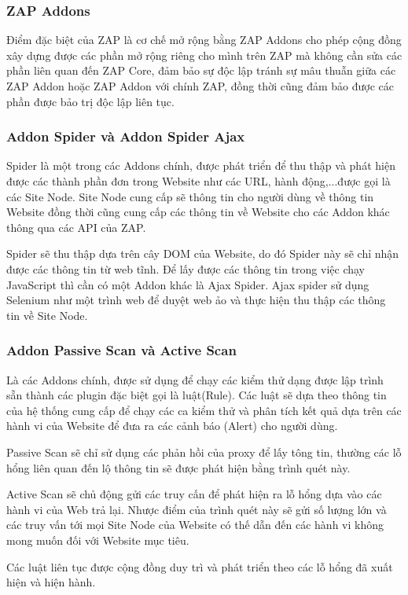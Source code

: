\documentclass[./../main.tex]{subfiles}
\begin{document}
\subsubsection{ZAP Addons}
Điểm đặc biệt của ZAP là cơ chế mở rộng bằng ZAP Addons cho phép cộng đồng
xây dựng được các phần mở rộng riêng cho mình trên ZAP mà không cần sửa
các phần liên quan đến ZAP Core, đảm bảo sự độc lập tránh sự mâu thuẫn giữa
các ZAP Addon hoặc ZAP Addon với chính ZAP, đồng thời cũng đảm bảo được các
phần được bảo trị độc lập liên tục.

\subsubsection{Addon Spider và Addon Spider Ajax}
Spider là một trong các Addons chính, được phát triển để thu thập và phát
hiện được các thành phần đơn trong Website như các URL, hành động,...được gọi là các
Site Node. Site Node cung cấp sẽ thông tin cho người dùng về thông tin
Website đồng thời cũng cung cấp các thông tin về Website cho các Addon
khác thông qua các API của ZAP.

Spider sẽ thu thập dựa trên cây DOM của Website, do đó Spider này sẽ chỉ nhận
được các thông tin từ web tĩnh. Để lấy được các thông tin trong việc chạy
JavaScript thì cần có một Addon khác là Ajax Spider. Ajax spider sử dụng
Selenium như một trình web để duyệt web ảo và thực hiện thu thập các thông
tin về Site Node.
\subsubsection{Addon Passive Scan và Active Scan}
Là các Addons chính, được sử dụng để chạy các kiểm thử dạng được lập trình
sẵn thành các plugin đặc biệt gọi là luật(Rule). Các luật sẽ dựa theo thông
tin của hệ thống cung cấp để chạy các ca kiểm thử và phân tích kết quả dựa
trên các hành vi của Website để đưa ra các cảnh báo (Alert) cho người dùng.

Passive Scan sẽ chỉ sử dụng các phản hồi của proxy để lấy tông tin, thường
các lỗ hổng liên quan đến lộ thông tin sẽ được phát hiện bằng trình quét này.

Active Scan sẽ chủ động gửi các truy cấn để phát hiện ra lỗ hổng dựa vào
các hành vi của Web trả lại. Nhược điểm của trình quét này sẽ gửi số lượng
lớn và các truy vấn tới mọi Site Node của Website có thế dẫn đến các hành vi
không mong muốn đối với Website mục tiêu.

Các luật liên tục được cộng đồng duy trì và phát triển theo các lỗ hổng
đã xuất hiện và hiện hành.
\end{document}
